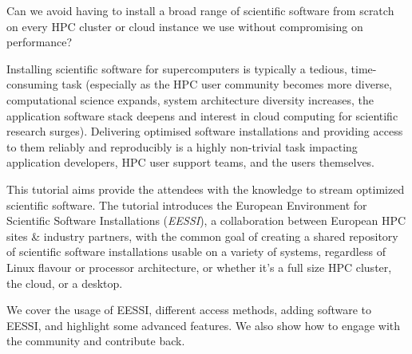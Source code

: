 Can we avoid having to install a broad range of scientific software from scratch on every HPC cluster or
cloud instance we use without compromising on performance?

Installing scientific software for supercomputers is typically a tedious, time-consuming task (especially as the
HPC user community becomes more diverse, computational science expands, system architecture diversity increases, the
application software stack deepens and interest in cloud computing for scientific research surges).
Delivering optimised software installations and providing access to them reliably and reproducibly
is a highly non-trivial task impacting application developers, HPC user support teams, and the users themselves.

This tutorial aims provide the attendees with the knowledge to stream optimized scientific software.
The tutorial introduces the European Environment for Scientific Software Installations (\emph{EESSI}), a collaboration
between European HPC sites \& industry partners, with the common goal of creating a shared repository of scientific
software installations usable on a variety of systems, regardless of Linux flavour or processor architecture, or
whether it's a full size HPC cluster, the cloud, or a desktop.

We cover the usage of EESSI, different access methods, adding software to EESSI, and highlight some advanced features.
We also show how to engage with the community and contribute back.

